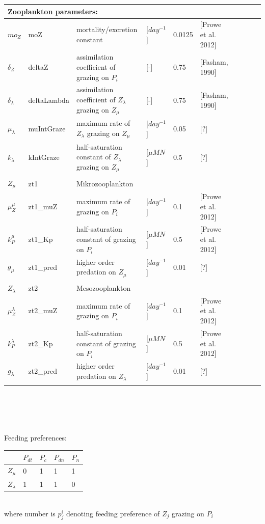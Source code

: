 \begin{tabular}{llllllllll}
  \\
  \hline
  \multicolumn{3}{l}{Zooplankton parameters:} \\
  \hline
  $mo_Z$ & moZ &  mortality/excretion constant & [$day^{-1}$] & 0.0125 & [Prowe et al. 2012]\\
  $\delta_Z$ & deltaZ & assimilation coefficient of grazing on $P_i$ & [-] & 0.75 & [Fasham, 1990]\\
  $\delta_{\lambda}$ & deltaLambda & assimilation coefficient of $Z_{\lambda}$ grazing on $Z_{\mu}$ & [-] & 0.75 & [Fasham, 1990]\\ 
  $\mu_{\lambda}$ & muIntGraze & maximum rate of $Z_{\lambda}$ grazing on $Z_{\mu}$ & [$day^{-1}$] & 0.05 & [?]\\
  $k_{\lambda}$ & kIntGraze & half-saturation constant of $Z_{\lambda}$ grazing on $Z_{\mu}$ & [$\mu M N$] & 0.5 & [?]\\ 
  \\
  $Z_{\mu}$ & zt1 & Mikrozooplankton\\
  \hline
  $\mu^{\mu}_Z$ & zt1\_muZ & maximum rate of grazing on $P_i$ & [$day^{-1}$] & 0.1 & [Prowe et al. 2012]\\ 
  $k^{\mu}_P$ & zt1\_Kp  & half-saturation constant of grazing on $P_i$ & [$\mu M N$] & 0.5 & [Prowe et al. 2012]\\
  $g_{\mu}$ & zt1\_pred & higher order predation on $Z_{\mu}$ & [$day^{-1}$] & 0.01 & [?]\\  
  \\
  $Z_{\lambda}$ & zt2 & Mesozooplankton\\
  \hline
  $\mu^{\lambda}_Z$ & zt2\_muZ & maximum rate of grazing on $P_i$ & [$day^{-1}$] & 0.1 & [Prowe et al. 2012]\\ 
  $k^{\lambda}_P$ & zt2\_Kp  & half-saturation constant of grazing on $P_i$ & [$\mu M N$] & 0.5 & [Prowe et al. 2012]\\
  $g_{\lambda}$ & zt2\_pred & higher order predation on $Z_{\lambda}$ & [$day^{-1}$] & 0.01 & [?]\\
  \\
  
  \hline
  \hline
\end{tabular}
\\\\\\\\
Feeding preferences: \\
\noindent
\begin{tabular}{l|l|l|l|l}
 
  & $P_{dt}$ & $P_{c}$ & $P_{dn}$ & $P_{n}$\\
\hline
$Z_{\mu}$ & 0 & 1 & 1 & 1\\
\hline
$Z_{\lambda}$ & 1 & 1 & 1 & 0\\
\hline
\end{tabular}
\\
where number is $p^i_j$ denoting feeding preference of $Z_j$ grazing on $P_i$



